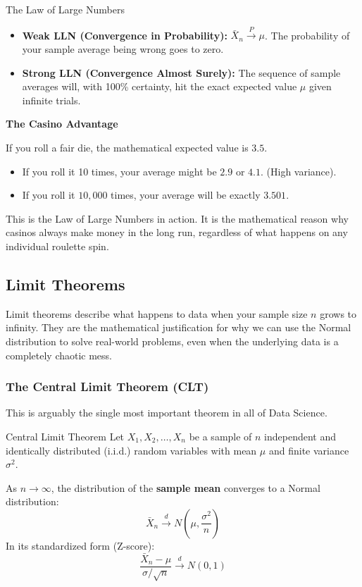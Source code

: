 \begin{defbox}{The Law of Large Numbers}
\begin{itemize}
    \item \textbf{Weak LLN (Convergence in Probability):} $\bar{X}_n \xrightarrow{P} \mu$. The probability of your sample average being wrong goes to zero.
    \item \textbf{Strong LLN (Convergence Almost Surely):} The sequence of sample averages will, with 100\% certainty, hit the exact expected value $\mu$ given infinite trials.
\end{itemize}
\end{defbox}

\vspace{0.2cm}
\begin{example}{\textbf{The Casino Advantage}}

If you roll a fair die, the mathematical expected value is $3.5$. 
\begin{itemize}
    \item If you roll it 10 times, your average might be $2.9$ or $4.1$. (High variance).
    \item If you roll it $10,000$ times, your average will be exactly $3.501$. 
\end{itemize}
This is the Law of Large Numbers in action. It is the mathematical reason why casinos always make money in the long run, regardless of what happens on any individual roulette spin.
\end{example}

\subsection{Limit Theorems}

Limit theorems describe what happens to data when your sample size $n$ grows to infinity. They are the mathematical justification for why we can use the Normal distribution to solve real-world problems, even when the underlying data is a completely chaotic mess.

\subsubsection{The Central Limit Theorem (CLT)}

This is arguably the single most important theorem in all of Data Science.

\begin{defbox}{Central Limit Theorem}
Let $X_1, X_2, \ldots, X_n$ be a sample of $n$ independent and identically distributed (i.i.d.) random variables with mean $\mu$ and finite variance $\sigma^2$. 

\vs

As $n \to \infty$, the distribution of the \textbf{sample mean} converges to a Normal distribution:
\begin{equation} \bar{X}_n \xrightarrow{d} N\left(\mu, \frac{\sigma^2}{n}\right) \end{equation}
In its standardized form (Z-score):
\begin{equation}\frac{\bar{X}_n - \mu}{\sigma/\sqrt{n}} \xrightarrow{d} N(0, 1) \end{equation}
\end{defbox}

